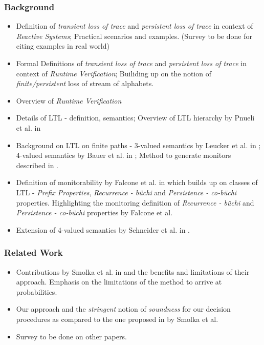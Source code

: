 \documentclass[]{article}
\newcommand{\tloss}{\emph{transient loss of trace}}
\newcommand{\ploss}{\emph{persistent loss of trace}}
\begin{document}
			\subsubsection{Background}
			\begin{itemize}
				\item Definition of \tloss{} and \ploss{} in context of \emph{Reactive Systems}; Practical scenarios and examples. (Survey to be done for citing examples in real world)
				\item Formal Definitions of \tloss{} and \ploss{} in context of \emph{Runtime Verification}; Builiding up on the notion of \emph{finite/persistent} loss of stream of alphabets.
				\item Overview of \emph{Runtime Verification}
				\item Details of LTL - definition, semantics; Overview of LTL hierarchy by Pnueli et al. in \cite{RefWorks:11}
				\item Background on LTL on finite paths - 3-valued semantics by Leucker et al. in \cite{RefWorks:10}; 4-valued semantics by Bauer et al. in \cite{RefWorks:12}; Method to generate monitors described in \cite{RefWorks:10}.
				\item Definition of monitorability by Falcone et al. in \cite{RefWorks:9} which builds up on classes of LTL - \emph{Prefix Properties}, \emph{Recurrence - b\"{u}chi} and \emph{Persistence - co-b\"{u}chi} properties. Highlighting the monitoring definition of \emph{Recurrence - b\"{u}chi} and \emph{Persistence - co-b\"{u}chi} properties by Falcone et al.
				\item Extension of 4-valued semantics by Schneider et al. in \cite{RefWorks:17}.
			\end{itemize}
			
			\subsubsection{Related Work}
			\begin{itemize}
				\item Contributions by Smolka et al. in \cite{RefWorks:14} and the benefits and limitations of their approach. Emphasis on the limitations of the method to arrive at probabilities.
				\item Our approach and the \emph{stringent} notion of \emph{soundness} for our decision procedures as compared to the one proposed in \cite{RefWorks:14} by Smolka et al.
				\item Survey to be done on other papers.
			\end{itemize}
			
\end{document}
